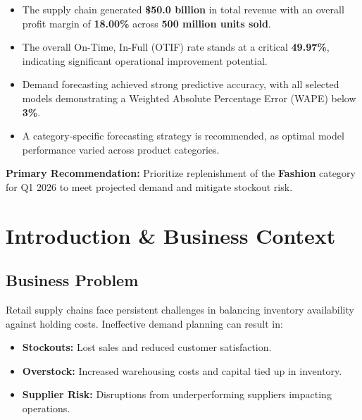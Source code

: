 \documentclass[11pt,a4paper]{article}
\begin{document}
\begin{keyfinding}
\begin{itemize}[leftmargin=1.5em]
    \item The supply chain generated \textbf{\$50.0 billion} in total revenue with an overall profit margin of \textbf{18.00\%} across \textbf{500 million units sold}.
    \item The overall On-Time, In-Full (OTIF) rate stands at a critical \textbf{49.97\%}, indicating significant operational improvement potential.
    \item Demand forecasting achieved strong predictive accuracy, with all selected models demonstrating a Weighted Absolute Percentage Error (WAPE) below \textbf{3\%}.
    \item A category-specific forecasting strategy is recommended, as optimal model performance varied across product categories.
\end{itemize}
\end{keyfinding}

\vspace{0.5cm}

\textbf{Primary Recommendation:} Prioritize replenishment of the \textbf{Fashion} category for Q1 2026 to meet projected demand and mitigate stockout risk.

\section{Introduction \& Business Context}

\subsection{Business Problem}

Retail supply chains face persistent challenges in balancing inventory availability against holding costs. Ineffective demand planning can result in:

\begin{itemize}[leftmargin=1.5em]
    \item \textbf{Stockouts:} Lost sales and reduced customer satisfaction.
    \item \textbf{Overstock:} Increased warehousing costs and capital tied up in inventory.
    \item \textbf{Supplier Risk:} Disruptions from underperforming suppliers impacting operations.
\end{itemize}
\end{document}
